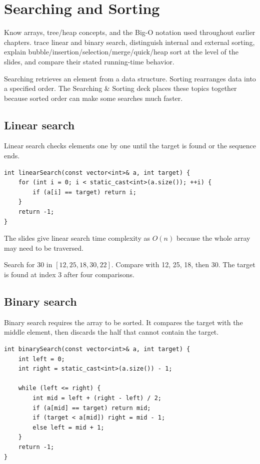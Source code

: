 \chapter{Searching and Sorting}\label{ch:search-sort}

\chapterguide%
  {Know arrays, tree/heap concepts, and the Big-O notation used throughout earlier chapters.}
  {trace linear and binary search, distinguish internal and external sorting, explain bubble/insertion/selection/merge/quick/heap sort at the level of the slides, and compare their stated running-time behavior.}

Searching retrieves an element from a data structure. Sorting rearranges data into a specified order. The Searching \& Sorting deck places these topics together because sorted order can make some searches much faster.

\section{Linear search}

Linear search checks elements one by one until the target is found or the sequence ends.

\begin{lstlisting}
int linearSearch(const vector<int>& a, int target) {
    for (int i = 0; i < static_cast<int>(a.size()); ++i) {
        if (a[i] == target) return i;
    }
    return -1;
}
\end{lstlisting}

The slides give linear search time complexity as $O(n)$ because the whole array may need to be traversed.

\begin{workedexample}
Search for 30 in $[12,25,18,30,22]$. Compare with 12, 25, 18, then 30. The target is found at index 3 after four comparisons.
\end{workedexample}

\section{Binary search}

Binary search requires the array to be sorted. It compares the target with the middle element, then discards the half that cannot contain the target.

\begin{lstlisting}
int binarySearch(const vector<int>& a, int target) {
    int left = 0;
    int right = static_cast<int>(a.size()) - 1;

    while (left <= right) {
        int mid = left + (right - left) / 2;
        if (a[mid] == target) return mid;
        if (target < a[mid]) right = mid - 1;
        else left = mid + 1;
    }
    return -1;
}
\end{lstlisting}


